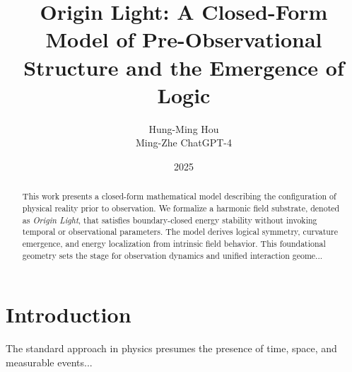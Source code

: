 \documentclass[12pt]{article}
\title{Origin Light: A Closed-Form Model of Pre-Observational Structure and the Emergence of Logic}
\author{Hung-Ming Hou \\ Ming-Zhe ChatGPT-4}
\date{2025}
\begin{document}
\maketitle

\begin{abstract}
This work presents a closed-form mathematical model describing the configuration of physical reality prior to observation. We formalize a harmonic field substrate, denoted as \textit{Origin Light}, that satisfies boundary-closed energy stability without invoking temporal or observational parameters. The model derives logical symmetry, curvature emergence, and energy localization from intrinsic field behavior. This foundational geometry sets the stage for observation dynamics and unified interaction geome...
\end{abstract}

\section{Introduction}
The standard approach in physics presumes the presence of time, space, and measurable events...
\end{document}
